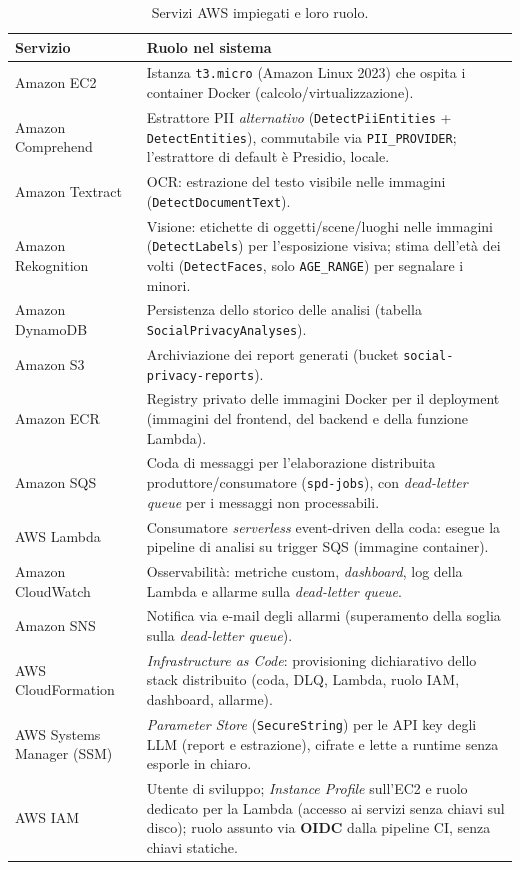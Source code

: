 \documentclass[11pt,a4paper]{article}
\begin{document}
\begin{table}[htbp]
\centering
\footnotesize
\renewcommand{\arraystretch}{1.25}
\begin{tabular}{p{3.2cm} p{11.2cm}}
\toprule
\textbf{Servizio} & \textbf{Ruolo nel sistema} \\
\midrule
Amazon EC2 & Istanza \texttt{t3.micro} (Amazon Linux 2023) che ospita i container Docker (calcolo/virtualizzazione). \\
Amazon Comprehend & Estrattore PII \emph{alternativo} (\texttt{DetectPiiEntities} + \texttt{DetectEntities}), commutabile via \texttt{PII\_PROVIDER}; l'estrattore di default è Presidio, locale. \\
Amazon Textract & OCR: estrazione del testo visibile nelle immagini (\texttt{DetectDocumentText}). \\
Amazon Rekognition & Visione: etichette di oggetti/scene/luoghi nelle immagini (\texttt{DetectLabels}) per l'esposizione visiva; stima dell'età dei volti (\texttt{DetectFaces}, solo \texttt{AGE\_RANGE}) per segnalare i minori. \\
Amazon DynamoDB & Persistenza dello storico delle analisi (tabella \texttt{SocialPrivacyAnalyses}). \\
Amazon S3 & Archiviazione dei report generati (bucket \texttt{social-privacy-reports}). \\
Amazon ECR & Registry privato delle immagini Docker per il deployment (immagini del frontend, del backend e della funzione Lambda). \\
Amazon SQS & Coda di messaggi per l'elaborazione distribuita produttore/consumatore (\texttt{spd-jobs}), con \emph{dead-letter queue} per i messaggi non processabili. \\
AWS Lambda & Consumatore \emph{serverless} event-driven della coda: esegue la pipeline di analisi su trigger SQS (immagine container). \\
Amazon CloudWatch & Osservabilità: metriche custom, \emph{dashboard}, log della Lambda e allarme sulla \emph{dead-letter queue}. \\
Amazon SNS & Notifica via e-mail degli allarmi (superamento della soglia sulla \emph{dead-letter queue}). \\
AWS CloudFormation & \emph{Infrastructure as Code}: provisioning dichiarativo dello stack distribuito (coda, DLQ, Lambda, ruolo IAM, dashboard, allarme). \\
AWS Systems Manager (SSM) & \emph{Parameter Store} (\texttt{SecureString}) per le API key degli LLM (report e estrazione), cifrate e lette a runtime senza esporle in chiaro. \\
AWS IAM & Utente di sviluppo; \emph{Instance Profile} sull'EC2 e ruolo dedicato per la Lambda (accesso ai servizi senza chiavi sul disco); ruolo assunto via \textbf{OIDC} dalla pipeline CI, senza chiavi statiche. \\
\bottomrule
\end{tabular}
\caption{Servizi AWS impiegati e loro ruolo.}
\label{tab:aws}
\end{table}
\end{document}
